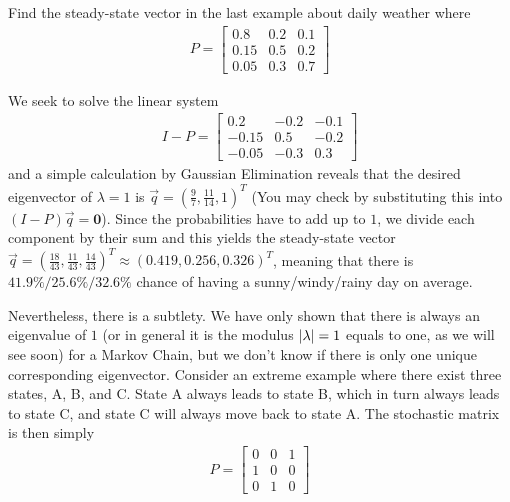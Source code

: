 \begin{exmp}
\label{exmp:dailyweathersteady}
Find the steady-state vector in the last example about daily weather where
\begin{align*}
P = 
\begin{bmatrix}
0.8 & 0.2 & 0.1\\
0.15 & 0.5 & 0.2 \\
0.05 & 0.3 & 0.7
\end{bmatrix}   
\end{align*}
\end{exmp}
\begin{solution}
We seek to solve the linear system
\begin{align*}
I - P = 
\begin{bmatrix}
0.2 & -0.2 & -0.1\\
-0.15 & 0.5 & -0.2 \\
-0.05 & -0.3 & 0.3
\end{bmatrix}   
\end{align*}
and a simple calculation by Gaussian Elimination reveals that the desired eigenvector of $\lambda=1$ is $\vec{q} = (\frac{9}{7}, \frac{11}{14}, 1)^T$ (You may check by substituting this into $(I-P)\vec{q} = \textbf{0}$). Since the probabilities have to add up to $1$, we divide each component by their sum and this yields the steady-state vector $\vec{q} = (\frac{18}{43}, \frac{11}{43}, \frac{14}{43})^T \approx (0.419, 0.256, 0.326)^T$, meaning that there is $41.9\% / 25.6\% / 32.6\%$ chance of having a sunny/windy/rainy day on average.
\end{solution}
Nevertheless, there is a subtlety. We have only shown that there is always an eigenvalue of $1$ (or in general it is the modulus $\abs{\lambda} = 1$ equals to one, as we will see soon) for a Markov Chain, but we don't know if there is only one unique corresponding eigenvector. Consider an extreme example where there exist three states, A, B, and C. State A always leads to state B, which in turn always leads to state C, and state C will always move back to state A. The stochastic matrix is then simply
\begin{align*}
P = \begin{bmatrix}
0 & 0 & 1\\
1 & 0 & 0 \\
0 & 1 & 0
\end{bmatrix}
\end{align*}
